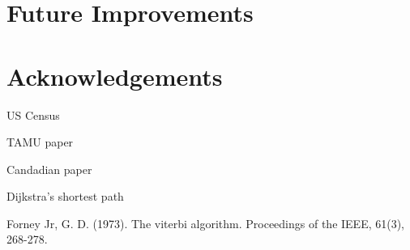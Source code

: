 \documentclass[conference]{IEEEtran}
\begin{document}
\section{Future Improvements}

\section{Acknowledgements}

\begin{thebibliography}{1}

\bibitem
US Census

\bibitem
TAMU paper

\bibitem
Candadian paper

Dijkstra's shortest path

Forney Jr, G. D. (1973). The viterbi algorithm. Proceedings of the IEEE, 61(3), 268-278.

\end{thebibliography}
\end{document}
